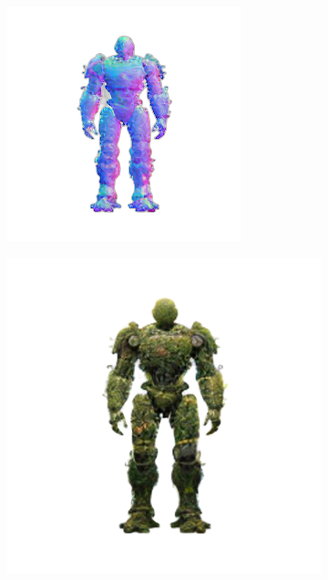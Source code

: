 \begin{figure}[ht]
\begin{subfigure}[b]{0.18\textwidth}
        \includegraphics[width=\textwidth]{etc/a robot made out of plants/wonder3d/normals_000_front}
        \caption{}
    \end{subfigure}
    \begin{subfigure}[b]{0.18\textwidth}
        \centering
        \fontsize{9pt}{7pt}\selectfont{}
        \includegraphics[width=\textwidth]{etc/a robot made out of plants/wonder3d/test/wonder3D_3000_front_part1}

\end{subfigure}
\end{figure}
